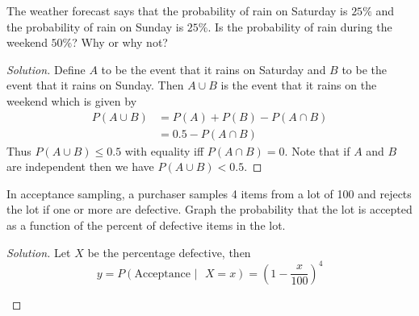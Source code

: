\begin{exercise}{9} \label{1.9}
    The weather forecast says that the probability of rain on Saturday is \( 25\% \) and the probability of rain on Sunday is \( 25\% \). Is the probability of rain during the weekend \( 50\%\)? Why or why not?
    
    \begin{proof}[Solution]
        Define \( A \) to be the event that it rains on Saturday and \( B \) to be the event that it rains on Sunday. Then \( A \cup B \) is the event that it rains on the weekend which is given by 
        \begin{align*} 
            P(A \cup B) &= P(A) + P(B) - P(A \cap B) \\
            &= 0.5 - P(A \cap B)
        \end{align*}
        Thus \( P(A \cup B) \leq 0.5 \) with equality iff \( P(A \cap B) = 0 \). Note that if \( A \) and \( B \) are independent then we have \( P(A \cup B) < 0.5 \).
    \end{proof}
\end{exercise}

\begin{exercise}{17} \label{1.17}
    In acceptance sampling, a purchaser samples 4 items from a lot of 100 and rejects the lot if one or more are defective. Graph the probability that the lot is accepted as a function of the percent of defective items in the lot.
    
    \begin{proof}[Solution] Let \( X \) be the percentage defective, then
    \[ y = P(\text{Acceptance }\vert \text{ } X = x) = \left( 1-\frac{x}{100} \right)^4 \]
        \begin{center}
        \end{center}
    \end{proof}
\end{exercise}

